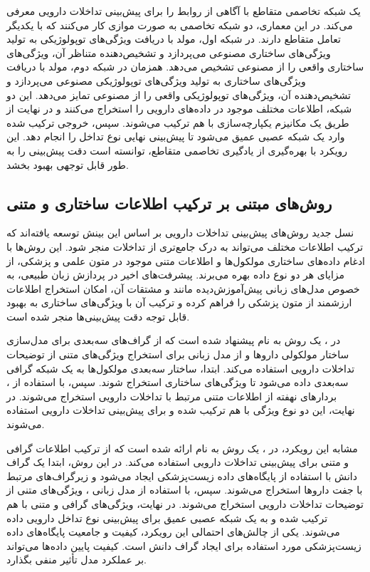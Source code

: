  \cite{ref_zhang2024} یک شبکه تخاصمی متقاطع با آگاهی از روابط را برای پیش‌بینی تداخلات دارویی معرفی می‌کند. در این معماری، دو شبکه تخاصمی به صورت موازی کار می‌کنند که با یکدیگر تعامل متقاطع دارند. در شبکه اول، مولد با دریافت ویژگی‌های توپولوژیکی به تولید ویژگی‌های ساختاری مصنوعی می‌پردازد و تشخیص‌دهنده متناظر آن، ویژگی‌های ساختاری واقعی را از مصنوعی تشخیص می‌دهد. همزمان در شبکه دوم، مولد با دریافت ویژگی‌های ساختاری به تولید ویژگی‌های توپولوژیکی مصنوعی می‌پردازد و تشخیص‌دهنده آن، ویژگی‌های توپولوژیکی واقعی را از مصنوعی تمایز می‌دهد. این دو شبکه، اطلاعات مختلف موجود در داده‌های دارویی را استخراج می‌کنند و در نهایت از طریق یک مکانیزم یکپارچه‌سازی با هم ترکیب می‌شوند. سپس، خروجی ترکیب شده وارد یک شبکه عصبی عمیق می‌شود تا پیش‌بینی نهایی نوع تداخل را انجام دهد. این رویکرد با بهره‌گیری از یادگیری تخاصمی متقاطع، توانسته است دقت پیش‌بینی را به طور قابل توجهی بهبود بخشد.

\subsection{روش‌های مبتنی بر ترکیب اطلاعات ساختاری و متنی}

نسل جدید روش‌های پیش‌بینی تداخلات دارویی بر اساس این بینش توسعه یافته‌اند که ترکیب اطلاعات مختلف می‌تواند به درک جامع‌تری از تداخلات منجر شود. این روش‌ها با ادغام داده‌های ساختاری مولکول‌ها و اطلاعات متنی موجود در متون علمی و پزشکی، از مزایای هر دو نوع داده بهره می‌برند. پیشرفت‌های اخیر در پردازش زبان طبیعی، به خصوص مدل‌های زبانی پیش‌آموزش‌دیده مانند  و مشتقات آن، امکان استخراج اطلاعات ارزشمند از متون پزشکی را فراهم کرده و ترکیب آن با ویژگی‌های ساختاری به بهبود قابل توجه دقت پیش‌بینی‌ها منجر شده است.

در \cite{ref_he2023}، یک روش به نام  پیشنهاد شده است که از گراف‌های سه‌بعدی برای مدل‌سازی ساختار مولکولی داروها و از مدل زبانی  برای استخراج ویژگی‌های متنی از توضیحات تداخلات دارویی استفاده می‌کند. ابتدا، ساختار سه‌بعدی مولکول‌ها به یک شبکه گرافی سه‌بعدی داده می‌شود تا ویژگی‌های ساختاری استخراج شوند. سپس، با استفاده از ، بردارهای نهفته از اطلاعات متنی مرتبط با تداخلات دارویی استخراج می‌شوند. در نهایت، این دو نوع ویژگی با هم ترکیب شده و برای پیش‌بینی تداخلات دارویی استفاده می‌شوند.

مشابه این رویکرد، در \cite{ref_shi2024}، یک روش به نام  ارائه شده است که از ترکیب اطلاعات گرافی و متنی برای پیش‌بینی تداخلات دارویی استفاده می‌کند. در این روش، ابتدا یک گراف دانش با استفاده از پایگاه‌های داده زیست‌پزشکی ایجاد می‌شود و زیرگراف‌های مرتبط با جفت داروها استخراج می‌شوند. سپس، با استفاده از مدل زبانی ، ویژگی‌های متنی از توضیحات تداخلات دارویی استخراج می‌شوند. در نهایت، ویژگی‌های گرافی و متنی با هم ترکیب شده و به یک شبکه عصبی عمیق برای پیش‌بینی نوع تداخل دارویی داده می‌شوند. یکی از چالش‌های احتمالی این رویکرد، کیفیت و جامعیت پایگاه‌های داده زیست‌پزشکی مورد استفاده برای ایجاد گراف دانش است. کیفیت پایین داده‌ها می‌تواند بر عملکرد مدل تأثیر منفی بگذارد.


